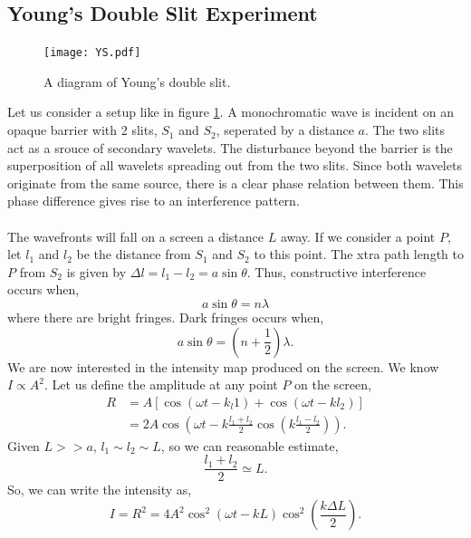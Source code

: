 \documentclass{book}
\begin{document}
\subsection{Young's Double Slit Experiment}
\begin{figure}[h]
	\centering
	\texttt{[image: YS.pdf]}
	\caption{A diagram of Young's double slit.}
	\label{YS}
\end{figure}
Let us consider a setup like in figure \ref{YS}. A monochromatic wave is incident on an opaque barrier with 2 slits, $S_1$ and $S_2$, seperated by a distance $a$. The two slits act as a srouce of secondary wavelets. The disturbance beyond the barrier is the superposition of all wavelets spreading out from the two slits.
Since both wavelets originate from the same source, there is a clear phase relation between them. This phase difference gives rise to an interference pattern.
\\\\
The wavefronts will fall on a screen a distance $L$ away. If we consider a point $P$, let $l_1$ and $l_2$ be the distance from $S_1$ and $S_2$ to this point. The xtra path length to $P$ from $S_2$ is given by $\Delta l = l_1 - l_2 = a \sin\theta$. Thus, constructive interference occurs when,
\begin{equation}
	a \sin\theta = n \lambda
\end{equation}
where there are bright fringes. Dark fringes occurs when,
\begin{equation}
	a\sin\theta = \left(n + \frac{1}{2}\right)\lambda.
\end{equation}
We are now interested in the intensity map produced on the screen. We know $I \propto A^2$. Let us define the amplitude at any point $P$ on the screen,
\begin{equation}
\begin{split}
	R & = A\left[\cos\left(\omega t - k_l1\right) + \cos(\omega t - kl_2)\right] \\
	& = 2A\cos\left(\omega t - k\frac{l_1 + l_2}{2}\cos\left(k\frac{l_1 - l_2}{2}\right)\right).
\end{split}
\end{equation}
Given $L >> a$, $l_1 \sim l_2 \sim L$, so we can reasonable estimate,
\begin{equation}
	\frac{l_1 + l_2}{2} \simeq L.
\end{equation}
So, we can write the intensity as,
\begin{equation}
	I = R^2 = 4A^2\cos^2(\omega t - kL)\cos^2\left(\frac{k\Delta L}{2}\right).
\end{equation}
\end{document}
